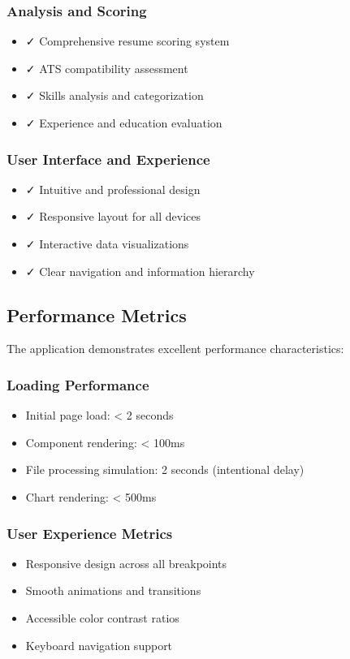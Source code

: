 \documentclass[12pt,a4paper]{article}
\begin{document}
\subsubsection{Analysis and Scoring}
\begin{itemize}
    \item ✓ Comprehensive resume scoring system
    \item ✓ ATS compatibility assessment
    \item ✓ Skills analysis and categorization
    \item ✓ Experience and education evaluation
\end{itemize}

\subsubsection{User Interface and Experience}
\begin{itemize}
    \item ✓ Intuitive and professional design
    \item ✓ Responsive layout for all devices
    \item ✓ Interactive data visualizations
    \item ✓ Clear navigation and information hierarchy
\end{itemize}

\subsection{Performance Metrics}
The application demonstrates excellent performance characteristics:

\subsubsection{Loading Performance}
\begin{itemize}
    \item Initial page load: < 2 seconds
    \item Component rendering: < 100ms
    \item File processing simulation: 2 seconds (intentional delay)
    \item Chart rendering: < 500ms
\end{itemize}

\subsubsection{User Experience Metrics}
\begin{itemize}
    \item Responsive design across all breakpoints
    \item Smooth animations and transitions
    \item Accessible color contrast ratios
    \item Keyboard navigation support
\end{itemize}
\end{document}
